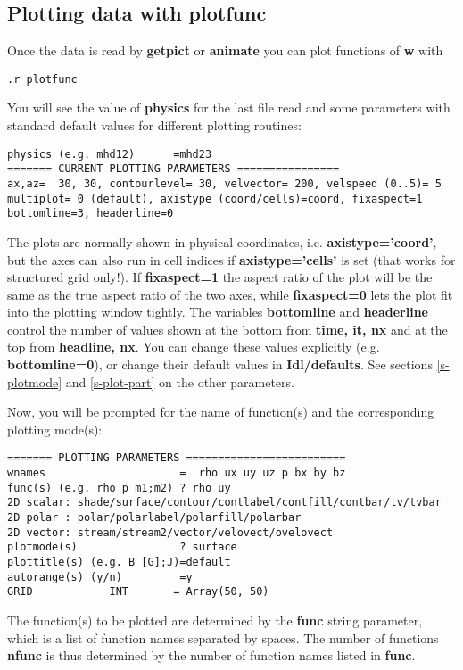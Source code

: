 \subsection{Plotting data with plotfunc \label{s-plotfunc}}

   Once the data is read by {\bf getpict} or {\bf animate} you can plot 
   functions of {\bf w} with
\begin{verbatim}
.r plotfunc
\end{verbatim}
   You will see the value of {\bf physics} for the last file read and some 
   parameters with standard default values for different plotting routines:
\begin{verbatim}
physics (e.g. mhd12)      =mhd23
======= CURRENT PLOTTING PARAMETERS ================
ax,az=  30, 30, contourlevel= 30, velvector= 200, velspeed (0..5)= 5
multiplot= 0 (default), axistype (coord/cells)=coord, fixaspect=1
bottomline=3, headerline=0
\end{verbatim}
   The plots are normally shown in physical coordinates, i.e.
   {\bf axistype='coord'}, but the axes can also run in cell indices 
   if {\bf axistype='cells'} is set (that works for structured grid only!).
   If {\bf fixaspect=1} the aspect ratio of the plot will be the same
   as the true aspect ratio of the two axes, while {\bf fixaspect=0} lets
   the plot fit into the plotting window tightly.
   The variables {\bf bottomline} and {\bf headerline} control the number
   of values shown at the bottom from {\bf time, it, nx} and at the top 
   from {\bf headline, nx}.
   You can change these values explicitly (e.g. {\bf bottomline=0}), or change 
   their default values in {\bf Idl/defaults}. 
   See sections \ref{s-plotmode} and \ref{s-plot-part} on the other parameters.

   Now, you will be prompted 
   for the name of function(s) and the corresponding plotting mode(s):
\begin{verbatim}
======= PLOTTING PARAMETERS =========================
wnames                     =  rho ux uy uz p bx by bz
func(s) (e.g. rho p m1;m2) ? rho uy
2D scalar: shade/surface/contour/contlabel/contfill/contbar/tv/tvbar
2D polar : polar/polarlabel/polarfill/polarbar
2D vector: stream/stream2/vector/velovect/ovelovect
plotmode(s)                ? surface
plottitle(s) (e.g. B [G];J)=default
autorange(s) (y/n)         =y
GRID            INT       = Array(50, 50)
\end{verbatim}
   The function(s) to be plotted are determined by the {\bf func}
   string parameter, which is a list of function names separated by spaces.
   The number of functions {\bf nfunc} is thus determined by the number of
   function names listed in {\bf func}. 

